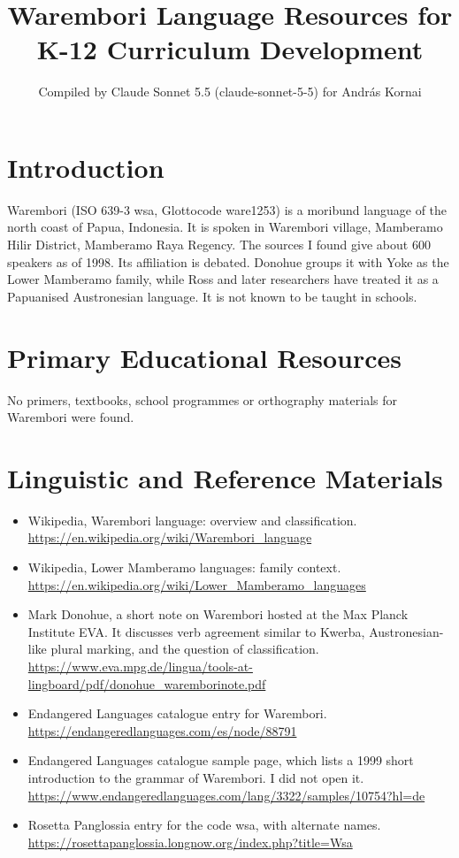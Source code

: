 \documentclass[12pt]{article}
\title{Warembori Language Resources for K-12 Curriculum Development}
\author{Compiled by Claude Sonnet 5.5 (claude-sonnet-5-5) for Andr\'as Kornai}
\date{}
\begin{document}
\maketitle

\section{Introduction}
Warembori (ISO 639-3 wsa, Glottocode ware1253) is a moribund language of the north coast of Papua, Indonesia. It is spoken in Warembori village, Mamberamo Hilir District, Mamberamo Raya Regency. The sources I found give about 600 speakers as of 1998. Its affiliation is debated. Donohue groups it with Yoke as the Lower Mamberamo family, while Ross and later researchers have treated it as a Papuanised Austronesian language. It is not known to be taught in schools.

\section{Primary Educational Resources}
No primers, textbooks, school programmes or orthography materials for Warembori were found.

\section{Linguistic and Reference Materials}
\begin{itemize}
\item Wikipedia, Warembori language: overview and classification. \url{https://en.wikipedia.org/wiki/Warembori_language}
\item Wikipedia, Lower Mamberamo languages: family context. \url{https://en.wikipedia.org/wiki/Lower_Mamberamo_languages}
\item Mark Donohue, a short note on Warembori hosted at the Max Planck Institute EVA. It discusses verb agreement similar to Kwerba, Austronesian-like plural marking, and the question of classification. \url{https://www.eva.mpg.de/lingua/tools-at-lingboard/pdf/donohue_waremborinote.pdf}
\item Endangered Languages catalogue entry for Warembori. \url{https://endangeredlanguages.com/es/node/88791}
\item Endangered Languages catalogue sample page, which lists a 1999 short introduction to the grammar of Warembori. I did not open it. \url{https://www.endangeredlanguages.com/lang/3322/samples/10754?hl=de}
\item Rosetta Panglossia entry for the code wsa, with alternate names. \url{https://rosettapanglossia.longnow.org/index.php?title=Wsa}
\end{itemize}
\end{document}
